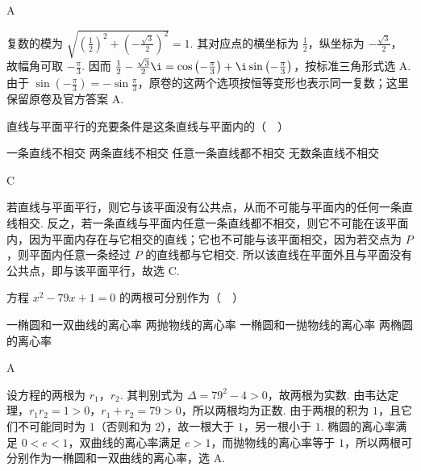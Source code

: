 \begin{answer}
A
\end{answer}

\begin{solution}
复数的模为 \(\sqrt{\left(\frac{1}{2}\right)^2+\left(-\frac{\sqrt{3}}{2}\right)^2}=1\). 其对应点的横坐标为 \(\frac{1}{2}\)，纵坐标为 \(-\frac{\sqrt{3}}{2}\)，故幅角可取 \(-\frac{\pi}{3}\). 因而 \(\frac{1}{2}-\frac{\sqrt{3}}{2}\i=\cos\left(-\frac{\pi}{3}\right)+\i\sin\left(-\frac{\pi}{3}\right)\)，按标准三角形式选 A. 由于 \(\sin\left(-\frac{\pi}{3}\right)=-\sin\frac{\pi}{3}\)，原卷的这两个选项按恒等变形也表示同一复数；这里保留原卷及官方答案 A.
\end{solution}

\begin{problem}

直线与平面平行的充要条件是这条直线与平面内的（\(\quad\)）

\choices
    {一条直线不相交}
    {两条直线不相交}
    {任意一条直线都不相交}
    {无数条直线不相交}
\end{problem}

\begin{answer}
C
\end{answer}

\begin{solution}
若直线与平面平行，则它与该平面没有公共点，从而不可能与平面内的任何一条直线相交. 反之，若一条直线与平面内任意一条直线都不相交，则它不可能在该平面内，因为平面内存在与它相交的直线；它也不可能与该平面相交，因为若交点为 \(P\)，则平面内任意一条经过 \(P\) 的直线都与它相交. 所以该直线在平面外且与平面没有公共点，即与该平面平行，故选 C.
\end{solution}

\begin{problem}

方程 \(x^{2} - 79x + 1 = 0\) 的两根可分别作为（\(\quad\)）

\choices
    {一椭圆和一双曲线的离心率}
    {两抛物线的离心率}
    {一椭圆和一抛物线的离心率}
    {两椭圆的离心率}
\end{problem}

\begin{answer}
A
\end{answer}

\begin{solution}
设方程的两根为 \(r_{1}\)，\(r_{2}\). 其判别式为 \(\Delta=79^{2}-4>0\)，故两根为实数. 由韦达定理，\(r_{1}r_{2}=1>0\)，\(r_{1}+r_{2}=79>0\)，所以两根均为正数. 由于两根的积为 \(1\)，且它们不可能同时为 \(1\)（否则和为 \(2\)），故一根大于 \(1\)，另一根小于 \(1\). 椭圆的离心率满足 \(0<e<1\)，双曲线的离心率满足 \(e>1\)，而抛物线的离心率等于 \(1\)，所以两根可分别作为一椭圆和一双曲线的离心率，选 A.
\end{solution}

